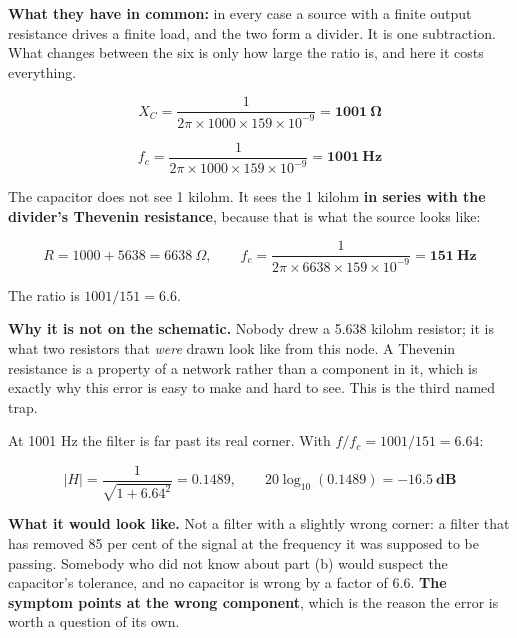 \textbf{What they have in common:} in every case a source with a finite output resistance drives a finite load, and the two form a divider. It is one subtraction. What changes between the six is only how large the ratio is, and here it costs everything.



\[
  X_C = \frac{1}{2\pi \times 1000 \times 159\times10^{-9}} = \mathbf{1001\ \Omega}
\]

\[
  f_c = \frac{1}{2\pi \times 1000 \times 159\times10^{-9}} = \mathbf{1001\ \text{Hz}}
\]


The capacitor does not see 1 kilohm. It sees the 1 kilohm \textbf{in series with the divider's Thevenin resistance}, because that is what the source looks like:

\[
  R = 1000 + 5638 = 6638\ \Omega, \qquad
  f_c = \frac{1}{2\pi \times 6638 \times 159\times10^{-9}} = \mathbf{151\ \text{Hz}}
\]

The ratio is $1001/151 = \mathbf{6.6}$.

\textbf{Why it is not on the schematic.} Nobody drew a 5.638 kilohm resistor; it is what two resistors that \emph{were} drawn look like from this node. A Thevenin resistance is a property of a network rather than a component in it, which is exactly why this error is easy to make and hard to see. This is the third named trap.


At 1001 Hz the filter is far past its real corner. With $f/f_c = 1001/151 = 6.64$:

\[
  |H| = \frac{1}{\sqrt{1 + 6.64^2}} = 0.1489, \qquad 20\log_{10}(0.1489) = \mathbf{-16.5\ \text{dB}}
\]

\textbf{What it would look like.} Not a filter with a slightly wrong corner: a filter that has removed 85 per cent of the signal at the frequency it was supposed to be passing. Somebody who did not know about part (b) would suspect the capacitor's tolerance, and no capacitor is wrong by a factor of 6.6. \textbf{The symptom points at the wrong component}, which is the reason the error is worth a question of its own.

